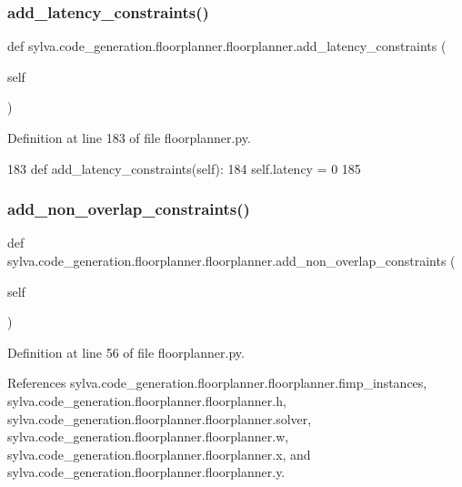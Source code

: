 \subsubsection{\texorpdfstring{add\+\_\+latency\+\_\+constraints()}{add\_latency\_constraints()}}
{\footnotesize\ttfamily def sylva.\+code\+\_\+generation.\+floorplanner.\+floorplanner.\+add\+\_\+latency\+\_\+constraints (\begin{DoxyParamCaption}\item[{}]{self }\end{DoxyParamCaption})}



Definition at line 183 of file floorplanner.\+py.


\begin{DoxyCode}
183   \textcolor{keyword}{def }add\_latency\_constraints(self):
184     self.latency = 0
185 
\end{DoxyCode}
\mbox{\label{classsylva_1_1code__generation_1_1floorplanner_1_1floorplanner_a5e9f74cf3d397e97186ce25d8304fbe0}} 
\subsubsection{\texorpdfstring{add\+\_\+non\+\_\+overlap\+\_\+constraints()}{add\_non\_overlap\_constraints()}}
{\footnotesize\ttfamily def sylva.\+code\+\_\+generation.\+floorplanner.\+floorplanner.\+add\+\_\+non\+\_\+overlap\+\_\+constraints (\begin{DoxyParamCaption}\item[{}]{self }\end{DoxyParamCaption})}



Definition at line 56 of file floorplanner.\+py.



References sylva.\+code\+\_\+generation.\+floorplanner.\+floorplanner.\+fimp\+\_\+instances, sylva.\+code\+\_\+generation.\+floorplanner.\+floorplanner.\+h, sylva.\+code\+\_\+generation.\+floorplanner.\+floorplanner.\+solver, sylva.\+code\+\_\+generation.\+floorplanner.\+floorplanner.\+w, sylva.\+code\+\_\+generation.\+floorplanner.\+floorplanner.\+x, and sylva.\+code\+\_\+generation.\+floorplanner.\+floorplanner.\+y.


